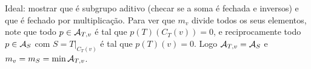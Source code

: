 \documentclass[../main.tex]{subfiles}
\begin{document}
Ideal: mostrar que é subgrupo aditivo (checar se a soma é fechada e inversos) e que é fechado por multiplicação. Para ver que \(m_{v}\) divide todos os seus elementos, note que todo \(p\in\mathcal{A}_{T,v}\) é tal que \(p(T)(C_{T}(v))=0\), e reciprocamente todo \(p\in\mathcal{A}_{S}\) com \(S=T|_{C_{T}(v)}\) é tal que \(p(T)(v)=0\). Logo \(\mathcal{A}_{T,v}=\mathcal{A}_{S}\) e \(m_{v}=m_{S}=\min\mathcal{A}_{T,v}\).
\end{document}
